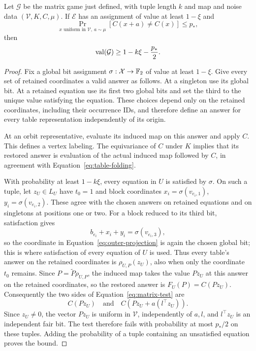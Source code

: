 \begin{lemma}
\label{lem:outer-completeness}
Let \(\mathcal G\) be the matrix game just defined, with tuple length
\(k\) and map and noise data \((\mathcal V,K,C,\mu)\).  If \(\mathcal E\)
has an assignment of value at least \(1-\xi\) and
\[
 \Pr_{x\text{ uniform in }\mathcal V,\ a\sim\mu}
       [C(x+a)\ne C(x)]\le p_*,
\]
then
\[
 \operatorname{val}(\mathcal G)\ge 1-k\xi-\frac{p_*}{2}.
\]
\end{lemma}

\begin{proof}
Fix a global bit assignment \(\sigma:\mathcal X\to\mathbb F_2\) of value
at least \(1-\xi\).  Give every set of
retained coordinates a valid answer as follows.  At a singleton use its global bit.
At a retained equation use its first two global bits and set the third
to the unique value satisfying the equation.  These choices depend only
on the retained coordinates, including their occurrence IDs, and therefore define an
answer for every table representation independently of its origin.

At an orbit representative, evaluate its induced map on this answer
and apply \(C\).  This defines a vertex labeling.  The equivariance of
\(C\) under \(K\) implies that its restored answer is evaluation of
the actual induced map followed by \(C\), in agreement with
Equation~\eqref{eq:table-folding}.

With probability at least \(1-k\xi\), every equation in \(U\) is
satisfied by \(\sigma\).  On such a tuple, let \(z_U\in L_U\) have
\(t_0=1\) and block coordinates
\(x_i=\sigma(v_{e_i,1})\), \(y_i=\sigma(v_{e_i,2})\).
These agree with the chosen answers on retained equations and
on singletons at positions one or two.  For a block reduced to its
third bit, satisfaction gives
\[
 b_{e_i}+x_i+y_i=\sigma(v_{e_i,3}),
\]
so the coordinate in Equation~\eqref{eq:outer-projection} is again the
chosen global bit; this is where satisfaction of every equation of
\(U\) is used.  Thus every table's answer on the retained coordinates is
\(\rho_{U,P}(z_U)\), also when only the coordinate \(t_0\) remains.
Since \(P=\widetilde P\rho_{U,P}\), the induced map takes the value
\(Pz_U\) at this answer on the retained coordinates, so the restored answer is
\(F_U(P)=C(Pz_U)\).  Consequently
the two sides of Equation~\eqref{eq:matrix-test} are
\[
 C(Pz_U)\quad\text{and}\quad
 C(Pz_U+a(l^\top z_U)).
\]
Since \(z_U\ne0\), the vector \(Pz_U\) is uniform in
\(\mathcal V\), independently of \(a,l\), and \(l^\top z_U\) is
an independent fair bit.  The test therefore fails with probability at
most \(p_*/2\) on these tuples.  Adding the probability of a tuple
containing an unsatisfied equation proves the bound.
\end{proof}
